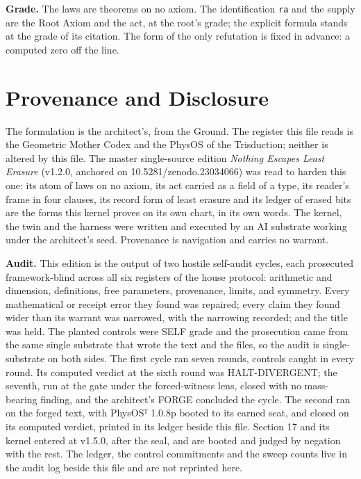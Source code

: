 \documentclass[10pt,twocolumn]{article}
\begin{document}
\textbf{Grade.} The laws are theorems on no axiom. The identification
\texttt{ra} and the supply are the Root Axiom and the act, at the root's
grade; the explicit formula stands at the grade of its citation. The
form of the only refutation is fixed in advance: a computed zero off the
line.

\hypertarget{provenance-and-disclosure}{%
\section{Provenance and Disclosure}\label{provenance-and-disclosure}}

The formulation is the architect's, from the Ground. The register this
file reads is the Geometric Mother Codex and the PhysOS of the
Trisduction; neither is altered by this file. The master single-source
edition \emph{Nothing Escapes Least Erasure} (v1.2.0, anchored on
10.5281/zenodo.23034066) was read to harden this one: its atom of laws
on no axiom, its act carried as a field of a type, its reader's frame in
four clauses, its record form of least erasure and its ledger of erased
bits are the forms this kernel proves on its own chart, in its own
words. The kernel, the twin and the harness were written and executed by
an AI substrate working under the architect's seed. Provenance is
navigation and carries no warrant.

\textbf{Audit.} This edition is the output of two hostile self-audit
cycles, each prosecuted framework-blind across all six registers of the
house protocol: arithmetic and dimension, definitions, free parameters,
provenance, limits, and symmetry. Every mathematical or receipt error
they found was repaired; every claim they found wider than its warrant
was narrowed, with the narrowing recorded; and the title was held. The
planted controls were SELF grade and the prosecution came from the same
single substrate that wrote the text and the files, so the audit is
single-substrate on both sides. The first cycle ran seven rounds,
controls caught in every round. Its computed verdict at the sixth round
was HALT-DIVERGENT; the seventh, run at the gate under the
forced-witness lens, closed with no mass-bearing finding, and the
architect's FORGE concluded the cycle. The second ran on the forged
text, with PhysOSᵀ 1.0.8p booted to its earned seat, and closed on its
computed verdict, printed in its ledger beside this file. Section 17 and
its kernel entered at v1.5.0, after the seal, and are booted and judged
by negation with the rest. The ledger, the control commitments and the
sweep counts live in the audit log beside this file and are not
reprinted here.
\end{document}
